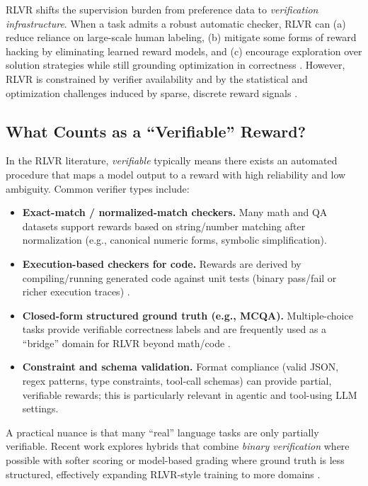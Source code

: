 \documentclass[unnumsec,webpdf,contemporary,large]{oup-authoring-template}
\theoremstyle{thmstyleone}
\theoremstyle{thmstyletwo}
\theoremstyle{thmstylethree}
\begin{document}
RLVR shifts the supervision burden from preference data to \emph{verification infrastructure}.
When a task admits a robust automatic checker, RLVR can (a) reduce reliance on large-scale human labeling, (b) mitigate some forms of reward hacking by eliminating learned reward models, and (c) encourage exploration over solution strategies while still grounding optimization in correctness \cite{guo2025deepseekr1,wen2025rlvr,cho2025safetycapability}.
However, RLVR is constrained by verifier availability and by the statistical and optimization challenges induced by sparse, discrete reward signals \cite{wei2025redit,wang2026verpo}.

\subsection{What Counts as a ``Verifiable'' Reward?}

In the RLVR literature, \emph{verifiable} typically means there exists an automated procedure that maps a model output to a reward with high reliability and low ambiguity.
Common verifier types include:

\begin{itemize}
  \item \textbf{Exact-match / normalized-match checkers.}
  Many math and QA datasets support rewards based on string/number matching after normalization (e.g., canonical numeric forms, symbolic simplification).
  \item \textbf{Execution-based checkers for code.}
  Rewards are derived by compiling/running generated code against unit tests (binary pass/fail or richer execution traces) \cite{le2022coderl,wang2026verpo}.
  \item \textbf{Closed-form structured ground truth (e.g., MCQA).}
  Multiple-choice tasks provide verifiable correctness labels and are frequently used as a ``bridge'' domain for RLVR beyond math/code \cite{zhang2025medrlvr}.
  \item \textbf{Constraint and schema validation.}
  Format compliance (valid JSON, regex patterns, type constraints, tool-call schemas) can provide partial, verifiable rewards; this is particularly relevant in agentic and tool-using LLM settings.
\end{itemize}

A practical nuance is that many ``real'' language tasks are only partially verifiable.
Recent work explores hybrids that combine \emph{binary verification} where possible with softer scoring or model-based grading where ground truth is less structured, effectively expanding RLVR-style training to more domains \cite{su2025crossingrewardbridge}.
\end{document}
